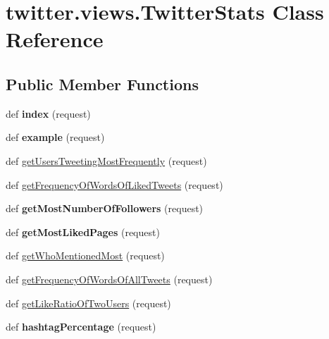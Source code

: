 \hypertarget{classtwitter_1_1views_1_1_twitter_stats}{}\section{twitter.\+views.\+Twitter\+Stats Class Reference}
\label{classtwitter_1_1views_1_1_twitter_stats}
\subsection*{Public Member Functions}
\begin{DoxyCompactItemize}
\item 
\mbox{\label{classtwitter_1_1views_1_1_twitter_stats_ae34b27b044e8f8493952f856866e1528}} 
def {\bfseries index} (request)
\item 
\mbox{\label{classtwitter_1_1views_1_1_twitter_stats_af34b050b301a95d439181f762ec5448f}} 
def {\bfseries example} (request)
\item 
def \hyperlink{classtwitter_1_1views_1_1_twitter_stats_a1b25912ecee8b0ee19af0948378a57fa}{get\+Users\+Tweeting\+Most\+Frequently} (request)
\item 
def \hyperlink{classtwitter_1_1views_1_1_twitter_stats_a880c4da522b5f91c401c54861dc3ad12}{get\+Frequency\+Of\+Words\+Of\+Liked\+Tweets} (request)
\item 
\mbox{\label{classtwitter_1_1views_1_1_twitter_stats_aab4275f1224264499ea247a721fa23ce}} 
def {\bfseries get\+Most\+Number\+Of\+Followers} (request)
\item 
\mbox{\label{classtwitter_1_1views_1_1_twitter_stats_ae955472d98f39a044a91efef95b7b156}} 
def {\bfseries get\+Most\+Liked\+Pages} (request)
\item 
def \hyperlink{classtwitter_1_1views_1_1_twitter_stats_a45827ee187a326fb1394d680bc483fb9}{get\+Who\+Mentioned\+Most} (request)
\item 
def \hyperlink{classtwitter_1_1views_1_1_twitter_stats_a48eab8e241bb382791c9f2803b57ca34}{get\+Frequency\+Of\+Words\+Of\+All\+Tweets} (request)
\item 
def \hyperlink{classtwitter_1_1views_1_1_twitter_stats_ae06146619068fb60465d6f99c4f9c369}{get\+Like\+Ratio\+Of\+Two\+Users} (request)
\item 
\mbox{\label{classtwitter_1_1views_1_1_twitter_stats_a78a796f6ed9c85bd1b8d5614138b84e6}} 
def {\bfseries hashtag\+Percentage} (request)
\end{DoxyCompactItemize}
